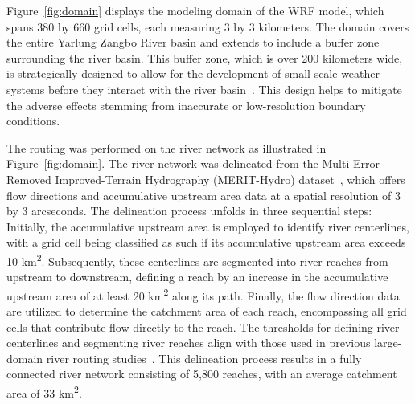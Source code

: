 \documentclass[draft]{agujournal2019}
\begin{document}
Figure~\ref{fig:domain} displays the modeling domain of the WRF model, which spans 380 by 660 grid cells, each measuring 3 by 3 kilometers. The domain covers the entire Yarlung Zangbo River basin and extends to include a buffer zone surrounding the river basin. This buffer zone, which is over 200 kilometers wide, is strategically designed to allow for the development of small-scale weather systems before they interact with the river basin~\cite{denis2002CD}. This design helps to mitigate the adverse effects stemming from inaccurate or low-resolution boundary conditions.

The routing was performed on the river network as illustrated in Figure~\ref{fig:domain}. The river network was delineated from the Multi-Error Removed Improved-Terrain Hydrography (MERIT-Hydro) dataset~\cite{yamazaki2017GRL, yamazaki2019WRR}, which offers flow directions and accumulative upstream area data at a spatial resolution of 3 by 3 arcseconds. The delineation process unfolds in three sequential steps: Initially, the accumulative upstream area is employed to identify river centerlines, with a grid cell being classified as such if its accumulative upstream area exceeds 10 km\textsuperscript{2}. Subsequently, these centerlines are segmented into river reaches from upstream to downstream, defining a reach by an increase in the accumulative upstream area of at least 20 km\textsuperscript{2} along its path. Finally, the flow direction data are utilized to determine the catchment area of each reach, encompassing all grid cells that contribute flow directly to the reach. The thresholds for defining river centerlines and segmenting river reaches align with those used in previous large-domain river routing studies~\cite{lin2021SD, lin2019WRR}. This delineation process results in a fully connected river network consisting of 5,800 reaches, with an average catchment area of 33 km\textsuperscript{2}.
\end{document}
